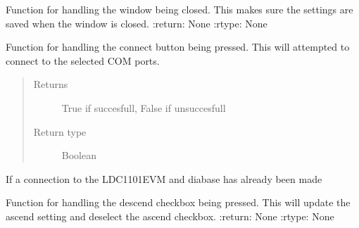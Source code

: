 \documentclass[letterpaper,10pt,english]{sphinxmanual}
\begin{document}
\begin{fulllineitems}
\begin{fulllineitems}
\label{\detokenize{index:app.MainWindow.closeEvent}}
\sphinxAtStartPar
Function for handling the window being closed. This makes sure the settings are saved when the window is closed.
:return: None
:rtype: None

\end{fulllineitems}


\begin{fulllineitems}
\label{\detokenize{index:app.MainWindow.connect}}
\sphinxAtStartPar
Function for handling the connect button being pressed. This will attempted to connect to the selected COM ports.
\begin{quote}\begin{description}
\item[{Returns}] \leavevmode
\sphinxAtStartPar
True if succesfull, False if unsuccesfull

\item[{Return type}] \leavevmode
\sphinxAtStartPar
Boolean

\end{description}\end{quote}

\end{fulllineitems}


\begin{fulllineitems}
\label{\detokenize{index:app.MainWindow.connected}}
\sphinxAtStartPar
If a connection to the LDC1101EVM and diabase has already been made

\end{fulllineitems}


\begin{fulllineitems}
\label{\detokenize{index:app.MainWindow.descend_changed}}
\sphinxAtStartPar
Function for handling the descend checkbox being pressed. This will update the ascend setting and deselect the ascend checkbox.
:return: None
:rtype: None


\end{fulllineitems}
\end{fulllineitems}
\end{document}
